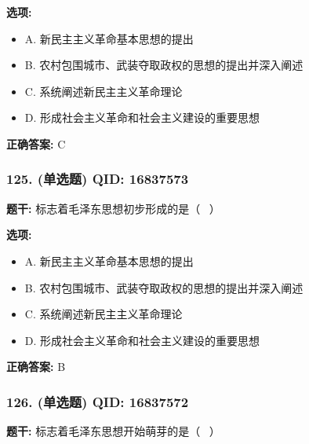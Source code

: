 \documentclass[12pt,UTF8]{ctexart}
\begin{document}
\textbf{选项:}
\begin{itemize}[leftmargin=*]

  \item A. 新民主主义革命基本思想的提出

  \item B. 农村包围城市、武装夺取政权的思想的提出并深入阐述

  \item C. 系统阐述新民主主义革命理论

  \item D. 形成社会主义革命和社会主义建设的重要思想

\end{itemize}

\textbf{正确答案:}
C

\vspace{0.3em}\hrulefill\vspace{0.7em}

\subsubsection*{125. (单选题) \small QID: 16837573}

\textbf{题干:}
标志着毛泽东思想初步形成的是（  ）

\textbf{选项:}
\begin{itemize}[leftmargin=*]

  \item A. 新民主主义革命基本思想的提出

  \item B. 农村包围城市、武装夺取政权的思想的提出并深入阐述

  \item C. 系统阐述新民主主义革命理论

  \item D. 形成社会主义革命和社会主义建设的重要思想

\end{itemize}

\textbf{正确答案:}
B

\vspace{0.3em}\hrulefill\vspace{0.7em}

\subsubsection*{126. (单选题) \small QID: 16837572}

\textbf{题干:}
标志着毛泽东思想开始萌芽的是（  ）
\end{document}
